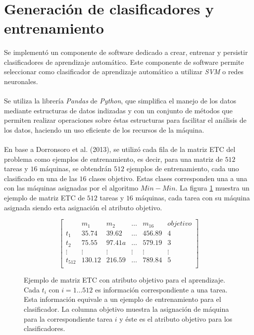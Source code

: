 \section{Generación de clasificadores y entrenamiento}

\paragraph{} Se implementó un componente de software dedicado a crear, entrenar y persistir clasificadores de aprendizaje automático. Este componente de software permite seleccionar como clasificador de aprendizaje automático a utilizar \textit{SVM} o redes neuronales.

\paragraph{} Se utiliza la librería \textit{Pandas}\citet{bib-pandas} de \textit{Python}, que simplifica el manejo de los datos mediante estructuras de datos indizadas y con un conjunto de métodos que permiten realizar operaciones sobre éstas estructuras para facilitar el análisis de los datos, haciendo un uso eficiente de los recursos de la máquina.

\paragraph{} En base a Dorronsoro et al. (2013), se utilizó cada fila de la matriz ETC del problema como ejemplos de entrenamiento, es decir, para una matriz de $512$ tareas y $16$ máquinas, se obtendrán $512$ ejemplos de entrenamiento, cada uno clasificado en una de las $16$ clases objetivo. Estas clases corresponden una a una con las máquinas asignadas por el algoritmo $Min-Min$. La figura \ref{table:datosentrenamiento} muestra un ejemplo de matriz ETC de $512$ tareas y $16$ máquinas, cada tarea con su máquina asignada siendo esta asignación el atributo objetivo.


\begin{figure}[ht!]
\[
\begin{bmatrix}
     & m_1 & m_2 & \dots  & m_{16} & objetivo \\
    t_1 & 35.74 & 39.62 & \dots  & 456.89 & 4 \\
    t_2 & 75.55 & 97.41a & \dots  & 579.19 & 3 \\
    \vdots & \vdots & \vdots & \vdots & \vdots & \vdots\\
    t_{512} & 130.12 & 216.59 & \dots  & 789.84 & 5\\
\end{bmatrix}
\]
\caption{Ejemplo de matriz ETC con atributo objetivo para el aprendizaje. Cada $t_i$ con $i = 1 \dots 512$ es información correspondiente a una tarea. Esta información equivale a un ejemplo de entrenamiento para el clasificador. La columna objetivo muestra la asignación de máquina para la correspondiente tarea $i$ y éste es el atributo objetivo para los clasificadores.}
\label{table:datosentrenamiento}
\end{figure}

